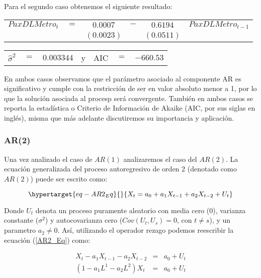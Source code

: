 \documentclass[
  a4paper,
]{article}
\begin{document}
Para el segundo caso obtenemos el siguiente resultado:

\begin{center}
\begin{tabular}{ c c c c c c } 
    $PaxDLMetro_t$ & $=$ & $0.0007$ & $-$ & $0.6194$  & $PaxDLMetro_{t-1}$ \\ 
    &  & $(0.0023)$ &  & $(0.0511)$ & 
\end{tabular}
\end{center}

\begin{center}
\begin{tabular}{ c c c c c c c } 
    $\hat{\sigma}^2$ & $=$ & $0.003344$ & y & AIC & $=$ & $-660.53$ 
\end{tabular}
\end{center}

En ambos casos observamos que el parámetro asociado al componente AR es
significativo y cumple con la restricción de ser en valor absoluto menor
a 1, por lo que la solución asociada al procesp será convergente.
También en ambos casos se reporta la estadística o Criterio de
Información de Akaike (AIC, por sus siglas en inglés), misma que más
adelante discutiremos su importancia y aplicación.

\hypertarget{ar2}{%
\subsubsection{AR(2)}\label{ar2}}

Una vez analizado el caso de \(AR(1)\) analizaremos el caso del
\(AR(2)\). La ecuación generalizada del proceso autoregresivo de orden 2
(denotado como \(AR(2)\)) puede ser escrito como:

\begin{equation}\protect\hypertarget{eq-AR2_Eq}{}{
X_t = a_0 + a_1 X_{t-1} + a_2 X_{t-2} + U_t
}\label{eq-AR2_Eq}\end{equation}

Donde \(U_t\) denota un proceso puramente aleatorio con media cero
(\(0\)), varianza constante (\(\sigma^2\)) y autocovarianza cero
(\(Cov(U_t, U_s) = 0\), con \(t \neq s\)), y un parametro
\(a_2 \neq 0\). Así, utilizando el operador rezago podemos reescribir la
ecuación (\ref{AR2_Eq}) como:

\begin{eqnarray*}
    X_t - a_1 X_{t-1} - a_2 X_{t-2} & = & a_0 + U_t \\
    (1 - a_1 L^1 - a_2 L^2) X_t & = & a_0 + U_t
\end{eqnarray*}
\end{document}
